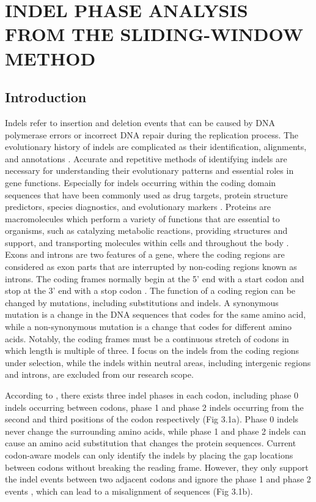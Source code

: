\chapter{\normalfont INDEL PHASE ANALYSIS FROM THE SLIDING-WINDOW METHOD}
\label{ch:indel_phase}

\section{Introduction}
Indels refer to insertion and deletion events that can be caused by DNA polymerase errors or incorrect DNA repair during the replication process. The evolutionary history of indels are complicated as their identification, alignments, and annotations \parencite{kunkel2004dna}. Accurate and repetitive methods of identifying indels are necessary for understanding their evolutionary patterns and essential roles in gene functions. Especially for indels occurring within the coding domain sequences that have been commonly used as drug targets, protein structure predictors, species diagnostics, and evolutionary markers \parencite{ajawatanawong2013evolution}.  
Proteins are macromolecules which perform a variety of functions that are essential to organisms, such as catalyzing metabolic reactions, providing structures and support, and transporting molecules within cells and throughout the body \parencite{cozzone2002proteins}. Exons and introns are two features of a gene, where the coding regions are considered as exon parts that are interrupted by non-coding regions known as introns. The coding frames normally begin at the 5’ end with a start codon and stop at the 3’ end with a stop codon \parencite{furuno2003cds}. The function of a coding region can be changed by mutations, including substitutions and indels. A synonymous mutation is a change in the DNA sequences that codes for the same amino acid, while a non-synonymous mutation is a change that codes for different amino acids. Notably, the coding frames must be a continuous stretch of codons in which length is multiple of three. I focus on the indels from the coding regions under selection, while the indels within neutral areas, including intergenic regions and introns, are excluded from our research scope. 

According to \cite{taylor2004occurrence}, there exists three indel phases in each codon, including phase 0 indels occurring between codons, phase 1 and phase 2 indels occurring from the second and third positions of the codon respectively (Fig 3.1a). Phase 0 indels never change the surrounding amino acids, while phase 1 and phase 2 indels can cause an amino acid substitution that changes the protein sequences. Current codon-aware models can only identify the indels by placing the gap locations between codons without breaking the reading frame. However, they only support the indel events between two adjacent codons and ignore the phase 1 and phase 2 events \parencite{kosiol2007empirical}, which can lead to a misalignment of sequences (Fig 3.1b).  

